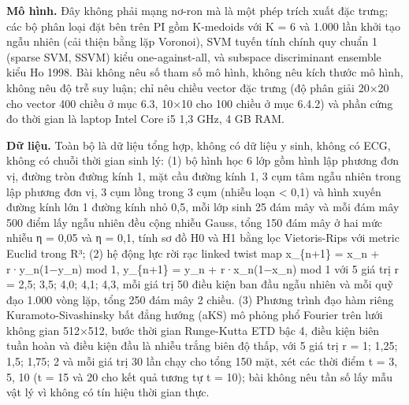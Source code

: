 \documentclass[12pt,a4paper]{article}
\begin{document}
\noindent \textbf{Mô hình.} Đây không phải mạng nơ-ron mà là một phép trích xuất đặc trưng; các bộ phân loại đặt bên trên PI gồm K-medoids với K = 6 và 1.000 lần khởi tạo ngẫu nhiên (cải thiện bằng lặp Voronoi), SVM tuyến tính chính quy chuẩn 1 (sparse SVM, SSVM) kiểu one-against-all, và subspace discriminant ensemble kiểu Ho 1998. Bài không nêu số tham số mô hình, không nêu kích thước mô hình, không nêu độ trễ suy luận; chỉ nêu chiều vector đặc trưng (độ phân giải 20×20 cho vector 400 chiều ở mục 6.3, 10×10 cho 100 chiều ở mục 6.4.2) và phần cứng đo thời gian là laptop Intel Core i5 1,3 GHz, 4 GB RAM.\par\vspace{3pt}
\noindent \textbf{Dữ liệu.} Toàn bộ là dữ liệu tổng hợp, không có dữ liệu y sinh, không có ECG, không có chuỗi thời gian sinh lý: (1) bộ hình học 6 lớp gồm hình lập phương đơn vị, đường tròn đường kính 1, mặt cầu đường kính 1, 3 cụm tâm ngẫu nhiên trong lập phương đơn vị, 3 cụm lồng trong 3 cụm (nhiễu loạn < 0,1) và hình xuyến đường kính lớn 1 đường kính nhỏ 0,5, mỗi lớp sinh 25 đám mây và mỗi đám mây 500 điểm lấy ngẫu nhiên đều cộng nhiễu Gauss, tổng 150 đám mây ở hai mức nhiễu η = 0,05 và η = 0,1, tính sơ đồ H0 và H1 bằng lọc Vietoris-Rips với metric Euclid trong R³; (2) hệ động lực rời rạc linked twist map x\_\{n+1\} = x\_n + r·y\_n(1−y\_n) mod 1, y\_\{n+1\} = y\_n + r·x\_n(1−x\_n) mod 1 với 5 giá trị r = 2,5; 3,5; 4,0; 4,1; 4,3, mỗi giá trị 50 điều kiện ban đầu ngẫu nhiên và mỗi quỹ đạo 1.000 vòng lặp, tổng 250 đám mây 2 chiều. (3) Phương trình đạo hàm riêng Kuramoto-Sivashinsky bất đẳng hướng (aKS) mô phỏng phổ Fourier trên lưới không gian 512×512, bước thời gian Runge-Kutta ETD bậc 4, điều kiện biên tuần hoàn và điều kiện đầu là nhiễu trắng biên độ thấp, với 5 giá trị r = 1; 1,25; 1,5; 1,75; 2 và mỗi giá trị 30 lần chạy cho tổng 150 mặt, xét các thời điểm t = 3, 5, 10 (t = 15 và 20 cho kết quả tương tự t = 10); bài không nêu tần số lấy mẫu vật lý vì không có tín hiệu thời gian thực.\par\vspace{3pt}
\end{document}
